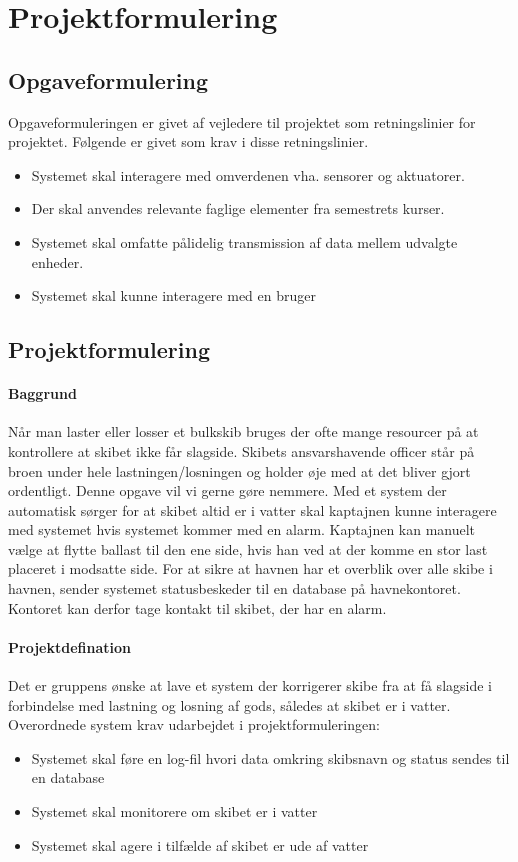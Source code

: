 \chapter{Projektformulering}
\section{Opgaveformulering}
\label{ch:Opgaveformulering}
Opgaveformuleringen er givet af vejledere til projektet som retningslinier for projektet. Følgende er givet som krav i disse retningslinier.
\begin{itemize}
\item Systemet skal interagere med omverdenen vha. sensorer og aktuatorer.
\item Der skal anvendes relevante faglige elementer fra semestrets kurser.
\item Systemet skal omfatte pålidelig transmission af data mellem udvalgte enheder.
\item Systemet skal kunne interagere med en bruger
\end{itemize}
\section{Projektformulering}
\label{ch:Projektformulering}
\subsubsection{Baggrund}
Når man laster eller losser et bulkskib bruges der ofte mange resourcer på at kontrollere at skibet ikke får slagside. Skibets ansvarshavende officer står på broen under hele lastningen/losningen og holder øje med at det bliver gjort ordentligt. Denne opgave vil vi gerne gøre nemmere. Med et system der automatisk sørger for at skibet altid er i vatter skal kaptajnen kunne interagere med systemet hvis systemet kommer med en alarm. Kaptajnen kan manuelt vælge at flytte ballast til den ene side, hvis han ved at der komme en stor last placeret i modsatte side. For at sikre at havnen har et overblik over alle skibe i havnen, sender systemet statusbeskeder til en database på havnekontoret. Kontoret kan derfor tage kontakt til skibet, der har en alarm.
\subsubsection{Projektdefination}
Det er gruppens ønske at lave et system der korrigerer skibe fra at få slagside i forbindelse med lastning og losning af gods, således at skibet er i vatter. Overordnede system krav udarbejdet i projektformuleringen:
\begin{itemize}
\item Systemet skal føre en log-fil hvori data omkring skibsnavn og status sendes til en database
\item Systemet skal monitorere om skibet er i vatter
\item Systemet skal agere i tilfælde af skibet er ude af vatter
\end{itemize}
